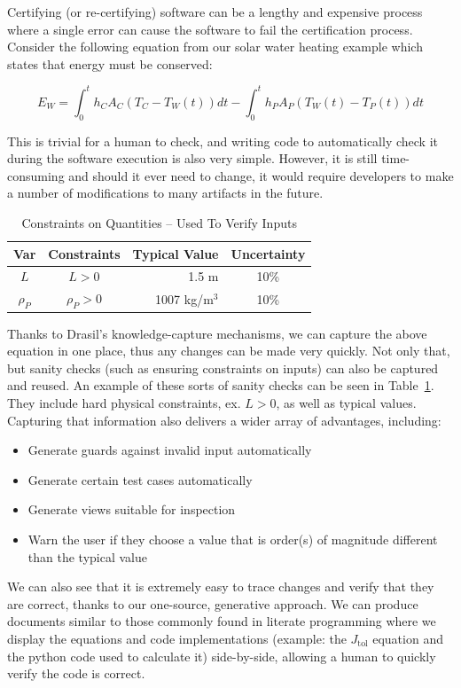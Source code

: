 \documentclass[sigconf]{acmart}
\newcommand{\jtol}{$J_{\mbox{tol}}$}
\begin{document}
Certifying (or re-certifying) software can be a lengthy and expensive process 
where a single error can cause the software to fail the certification process. 
Consider the following equation from our solar water heating example which 
states that energy must be conserved:

\begin{equation*}
E_W = \int_{0}^{t} h_C A_C (T_C - T_W(t)) dt - \int_{0}^{t} h_P A_P (T_W(t) - T_P(t)) dt
\end{equation*}

This is trivial for a human to check, and writing code to automatically check it 
during the software execution is also very simple. However, it is still 
time-consuming and should it ever need to change, it would require developers to 
make a number of modifications to many artifacts in the future.

\begin{table} 
\centering
\caption{Constraints on Quantities -- Used To Verify Inputs}
\begin{tabular}{c c r c } 
\toprule
\textbf{Var} & \textbf{Constraints} & \textbf{Typical Value} & \textbf{Uncertainty}\\ \midrule
$L$ & $L > 0$ & 1.5 m & 10\% \\ 
$\rho_P$ & $\rho_P > 0$	& 1007 kg/m$^3$	& 10\% \\
\bottomrule
\end{tabular}
\label{tab:pcm}
\end{table}

Thanks to Drasil's knowledge-capture mechanisms, we can capture the above 
equation in one place, thus any changes can be made very quickly. Not only 
that, but sanity checks (such as ensuring constraints on inputs) can also be 
captured and reused. An example of these sorts of sanity checks can be seen in 
Table~\ref{tab:pcm}. They include hard physical constraints, ex. $L > 0$, as 
well as typical values. Capturing that information also 
delivers a wider array of advantages, including:

\begin{itemize}
\item Generate guards against invalid input automatically
\item Generate certain test cases automatically
\item Generate views suitable for inspection
\item Warn the user if they choose a value that is order(s) of magnitude different than 
the typical value
\end{itemize}
We can also see that it is extremely easy to trace changes and verify that they 
are correct, thanks to our one-source, generative approach. We can produce 
documents similar to those commonly found in literate programming where we 
display the equations and code implementations (example: the \jtol{} equation 
and the python code used to calculate it) side-by-side, allowing a human to 
quickly verify the code is correct.
\end{document}
